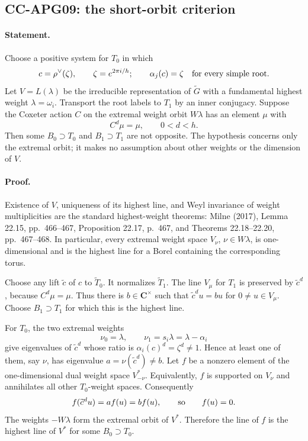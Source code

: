\documentclass[11pt,a4paper]{article}
\theoremstyle{definition}\newtheorem{definition}[theorem]{Definition}
\theoremstyle{remark}\newtheorem{remark}[theorem]{Remark}
\begin{document}
\subsection{CC-APG09: the short-orbit criterion}

\paragraph{Statement.}
Choose a positive system for \(T_0\) in which
\[
        c=\rho^\vee(\zeta),\qquad \zeta=e^{2\pi i/h};
        \qquad \alpha_j(c)=\zeta\quad\hbox{for every simple root}.
\]
Let \(V=L(\lambda)\) be the irreducible representation of
\(\widetilde G\) with a fundamental highest weight
\(\lambda=\omega_i\). Transport the root labels to \(T_1\) by an
inner conjugacy. Suppose the Coxeter action \(C\) on the extremal
weight orbit \(W\lambda\) has an element \(\mu\) with
\[
                         C^d\mu=\mu,\qquad 0<d<h.
\]
Then some \(B_0\supset T_0\) and \(B_1\supset T_1\) are not opposite.
The hypothesis concerns only the extremal orbit; it makes no
assumption about other weights or the dimension of \(V\).

\paragraph{Proof.}
Existence of \(V\), uniqueness of its highest line, and Weyl
invariance of weight multiplicities are the standard highest-weight
theorems: Milne (2017), Lemma 22.15, pp.~466--467,
Proposition 22.17, p.~467, and Theorems 22.18--22.20,
pp.~467--468. In particular, every extremal
weight space \(V_\nu\), \(\nu\in W\lambda\), is one-dimensional and
is the highest line for a Borel containing the corresponding torus.

Choose any lift \(\widetilde c\) of \(c\) to
\(\widetilde T_0\). It normalizes \(\widetilde T_1\).
The line \(V_\mu\) for \(T_1\) is preserved by
\(\widetilde c^d\), because \(C^d\mu=\mu\).
Thus there is \(b\in\mathbf C^\times\) such that
\(\widetilde c^d u=bu\) for \(0\ne u\in V_\mu\).
Choose \(B_1\supset T_1\) for which this is the highest line.

For \(T_0\), the two extremal weights
\[
               \nu_0=\lambda,\qquad
               \nu_1=s_i\lambda=\lambda-\alpha_i
\]
give eigenvalues of \(\widetilde c^d\) whose ratio is
\(\alpha_i(c)^d=\zeta^d\ne1\).
Hence at least one of them, say \(\nu\), has eigenvalue
\(a=\nu(\widetilde c^d)\ne b\).
Let \(f\) be a nonzero element of the one-dimensional dual weight
space \(V^*_{-\nu}\). Equivalently, \(f\) is supported on \(V_\nu\)
and annihilates all other \(T_0\)-weight spaces. Consequently
\[
       f(\widetilde c^d u)=a f(u)=b f(u),
                  \qquad\hbox{so}\qquad f(u)=0.
\]
The weights \(-W\lambda\) form the extremal orbit of \(V^*\).
Therefore the line of \(f\) is the highest line of \(V^*\) for
some \(B_0\supset T_0\).
\end{document}
